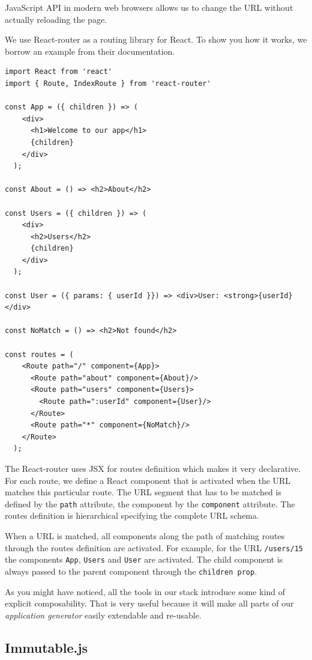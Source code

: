 JavaScript API in modern web browsers allows us to change the URL without actually reloading the page.

We use React-router \cite{react-router} as a routing library for React. To show you how it works, we borrow an example from their documentation.

\begin{verbatim}
import React from 'react'
import { Route, IndexRoute } from 'react-router'

const App = ({ children }) => (
    <div>
      <h1>Welcome to our app</h1>
      {children}
    </div>
  );

const About = () => <h2>About</h2>

const Users = ({ children }) => (
    <div>
      <h2>Users</h2>
      {children}
    </div>
  );

const User = ({ params: { userId }}) => <div>User: <strong>{userId}</div>

const NoMatch = () => <h2>Not found</h2>

const routes = (
    <Route path="/" component={App}>
      <Route path="about" component={About}/>
      <Route path="users" component={Users}>
        <Route path=":userId" component={User}/>
      </Route>
      <Route path="*" component={NoMatch}/>
    </Route>
  );
\end{verbatim}

The React-router uses JSX for routes definition which makes it very declarative. For each route, we define a React component that is activated when the URL matches this particular route. The URL segment that has to be matched is defined by the \texttt{path} attribute, the component by the \texttt{component} attribute. The routes definition is hierarchical specifying the complete URL schema.

When a URL is matched, all components along the path of matching routes through the routes definition are activated. For example, for the URL \texttt{/users/15} the components \texttt{App}, \texttt{Users} and \texttt{User} are activated. The child component is always passed to the parent component through the \texttt{children prop}. 

As you might have noticed, all the tools in our stack introduce some kind of explicit composability. That is very useful because it will make all parts of our  \emph{application generator} easily extendable and re-usable.

\subsection{Immutable.js}

